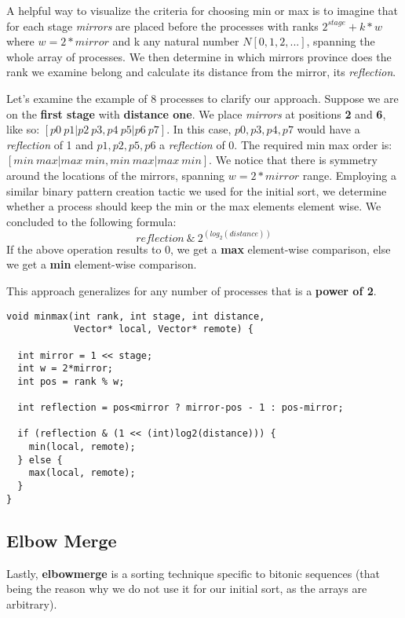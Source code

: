 \documentclass[12pt]{report}
\begin{document}
A helpful way to visualize the criteria for choosing min or max is to imagine that for each stage \textit{mirrors} are placed before the processes with ranks $2^{stage} + k*w$ where $w=2*mirror$ and k any natural number $N[0,1,2,...]$, spanning the whole array of processes. We then determine in which mirrors province does the rank we examine belong and calculate its distance from the mirror, its \textit{reflection}.

Let's examine the example of 8 processes to clarify our approach. Suppose we are on the \textbf{first stage} with \textbf{distance one}. We place \textit{mirrors} at positions \textbf{2} and \textbf{6}, like so: $[p0\:p1|p2\:p3,p4\:p5|p6\:p7]$. In this case, $p0,p3,p4,p7$ would have a \textit{reflection} of 1 and $p1,p2,p5,p6$ a \textit{reflection} of 0. The required min max order is: $[min\:max | max\:min, min\:max | max\:min]$.  We notice that there is symmetry around the locations of the mirrors, spanning $w=2*mirror$ range. Employing a similar binary pattern creation tactic we used for the initial sort, we determine whether a process should keep the min or the max elements element wise. We concluded to the following formula:
$$
reflection\:\&\: 2^{(log_2(distance))}
$$
If the above operation results to 0, we get a \textbf{max} element-wise comparison, else we get a \textbf{min} element-wise comparison.

This approach generalizes for any number of processes that is a \textbf{power of 2}. \newpage

\begin{lstlisting}[style=cstyle]
void minmax(int rank, int stage, int distance, 
            Vector* local, Vector* remote) {

  int mirror = 1 << stage;
  int w = 2*mirror;
  int pos = rank % w;

  int reflection = pos<mirror ? mirror-pos - 1 : pos-mirror; 

  if (reflection & (1 << (int)log2(distance))) {
    min(local, remote);
  } else {
    max(local, remote);
  }
}
\end{lstlisting}

\subsection{Elbow Merge}

Lastly,  \textbf{elbowmerge} is a sorting technique specific to bitonic sequences (that being the reason why we do not use it for our initial sort, as the arrays are arbitrary). 
\end{document}
